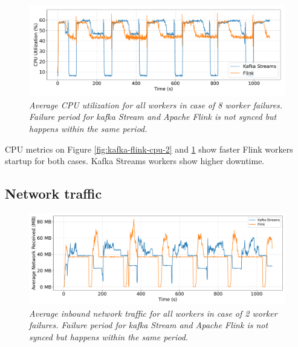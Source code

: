 \begin{figure}[H]
    \centering
    \includegraphics[width=1\textwidth]{figures/kafka-flink/cpu-utilization-8pods-kafka-flink}
    \caption{\textit{Average CPU utilization for all workers in case of 8 worker failures.
    Failure period for kafka Stream and Apache Flink is not synced but happens within the same period.}}
    \label{fig:kafka-flink-cpu-8}
\end{figure}

CPU metrics on Figure \ref{fig:kafka-flink-cpu-2} and \ref{fig:kafka-flink-cpu-8}
show faster Flink workers startup for both cases.
Kafka Streams workers show higher downtime.


\newpage
\subsection{Network traffic}\label{subsec:inbound-network}

\begin{figure}[H]
    \centering
    \includegraphics[width=1\textwidth]{figures/kafka-flink/network-received-2pod-kafka-flink}
    \caption{\textit{Average inbound network traffic for all workers in case of 2 worker failures.
    Failure period for kafka Stream and Apache Flink is not synced but happens within the same period.}}
    \label{fig:kafka-flink-received-2}
\end{figure}


